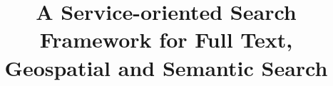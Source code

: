 \documentclass{acm_proc_article-sp}
\begin{document}
\lstset{language=Java}
\title{A Service-oriented Search Framework for Full Text, Geospatial and Semantic Search}
%
%
%
%
%
\end{document}
